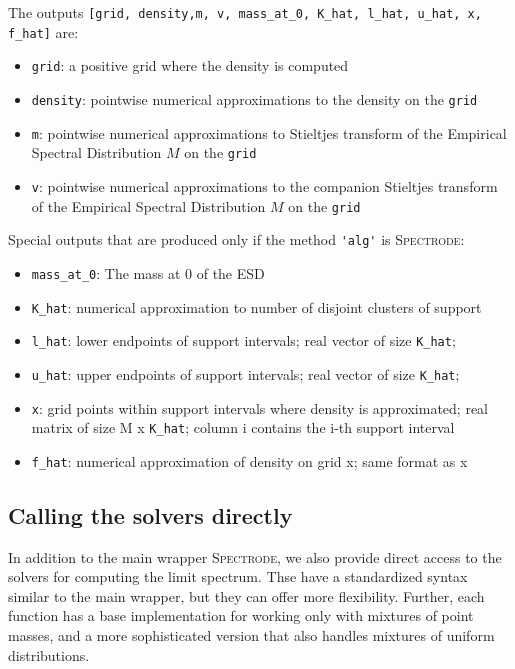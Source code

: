 \documentclass[english,11pt]{article} %
\begin{document}
The outputs \verb+[grid, density,m, v, mass_at_0, K_hat, l_hat, u_hat, x, f_hat]+ are: 

\begin{itemize}
\item \verb+grid+: a positive grid where the density is computed
\item \verb+density+: pointwise numerical approximations to the density on the \verb+grid+
\item \verb+m+: pointwise numerical approximations to Stieltjes transform of the Empirical Spectral Distribution $M$ on the \verb+grid+
\item \verb+v+: pointwise numerical approximations to the companion Stieltjes transform of the Empirical Spectral Distribution $M$ on the \verb+grid+
\end{itemize}

Special outputs that are produced only if the method \verb+'alg'+ is \textsc{Spectrode}: 
\begin{itemize}
\item \verb+mass_at_0+: The mass at 0 of the ESD
\item \verb+K_hat+: numerical approximation to number of disjoint clusters of support
\item \verb+l_hat+: lower endpoints of support intervals; real vector of size \verb+K_hat+;
\item \verb+u_hat+: upper endpoints of support intervals; real vector of size \verb+K_hat+;
\item \verb+x+: grid points within support intervals where density is approximated;
      real matrix of size M x \verb+K_hat+; column i contains the i-th support
     interval
\item \verb+f_hat+: numerical approximation of density on grid x; same format as x
\end{itemize}

\subsection{Calling the solvers directly}

In addition to the main wrapper \textsc{Spectrode}, we also provide direct access to the solvers for computing the limit spectrum. Thse have a standardized syntax similar to the main wrapper, but they can offer more flexibility. Further, each function has a base implementation for working only with mixtures of point masses, and a more sophisticated version that also handles mixtures of uniform distributions.
\end{document}
